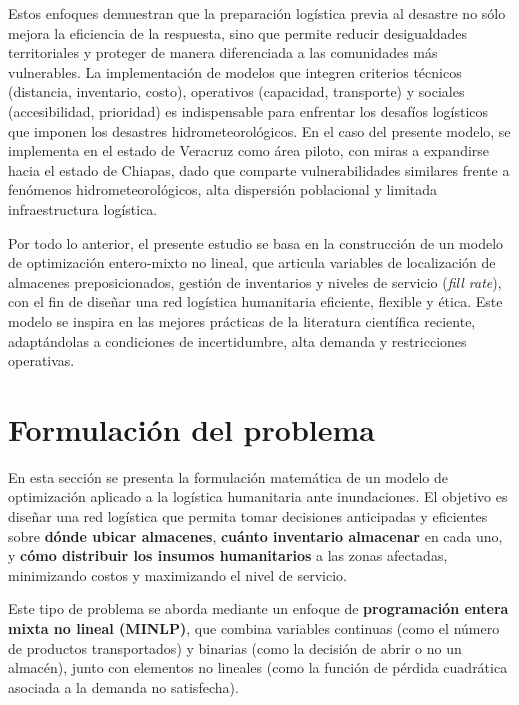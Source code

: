 \documentclass[
  spanish,
  us-letterpaper,
]{scrreprt}
\numberwithin{equation}{chapter} %
\begin{document}
Estos enfoques demuestran que la preparación logística previa al
desastre no sólo mejora la eficiencia de la respuesta, sino que permite
reducir desigualdades territoriales y proteger de manera diferenciada a
las comunidades más vulnerables. La implementación de modelos que
integren criterios técnicos (distancia, inventario, costo), operativos
(capacidad, transporte) y sociales (accesibilidad, prioridad) es
indispensable para enfrentar los desafíos logísticos que imponen los
desastres hidrometeorológicos. En el caso del presente modelo, se
implementa en el estado de Veracruz como área piloto, con miras a
expandirse hacia el estado de Chiapas, dado que comparte
vulnerabilidades similares frente a fenómenos hidrometeorológicos, alta
dispersión poblacional y limitada infraestructura logística.

Por todo lo anterior, el presente estudio se basa en la construcción de
un modelo de optimización entero‑mixto no lineal, que articula variables
de localización de almacenes preposicionados, gestión de inventarios y
niveles de servicio (\emph{fill rate}), con el fin de diseñar una red
logística humanitaria eficiente, flexible y ética. Este modelo se
inspira en las mejores prácticas de la literatura científica reciente,
adaptándolas a condiciones de incertidumbre, alta demanda y
restricciones operativas.


\chapter{Formulación del problema}\label{formulaciuxf3n-del-problema}

En esta sección se presenta la formulación matemática de un modelo de
optimización aplicado a la logística humanitaria ante inundaciones. El
objetivo es diseñar una red logística que permita tomar decisiones
anticipadas y eficientes sobre \textbf{dónde ubicar almacenes},
\textbf{cuánto inventario almacenar} en cada uno, y \textbf{cómo
distribuir los insumos humanitarios} a las zonas afectadas, minimizando
costos y maximizando el nivel de servicio.

Este tipo de problema se aborda mediante un enfoque de
\textbf{programación entera mixta no lineal (MINLP)}, que combina
variables continuas (como el número de productos transportados) y
binarias (como la decisión de abrir o no un almacén), junto con
elementos no lineales (como la función de pérdida cuadrática asociada a
la demanda no satisfecha).
\end{document}
